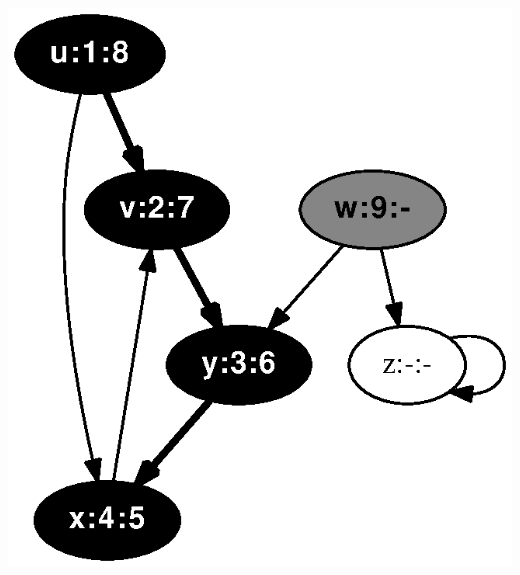 \documentclass{article}
\begin{document}
\vspace{1em}
\includegraphics[height=.3\textheight]{clrs_example_dfs_09.eps}
\vspace{1em}
\end{document}
